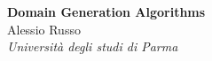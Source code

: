 \documentclass[a4paper,12pt]{article}
\begin{document}
\pagestyle{fancy}
\thispagestyle{empty}
\fancyhead[R]{}
\fancyhead[L]{}
\renewcommand*{\thefootnote}{\fnsymbol{footnote}}
\begin{center}
\Large{\textbf{Domain Generation Algorithms}}
\vspace{0.4cm}
\normalsize
\\ Alessio Russo \\
\vspace{0.1cm}
\textit{Università degli studi di Parma}
\vspace{0.1cm}
\medskip
\normalsize
\end{center}
\begin{multicols}{2}






\end{multicols}
\end{document}
